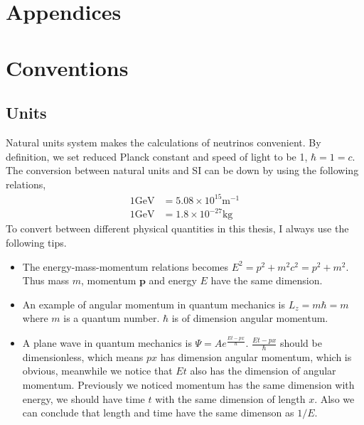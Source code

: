 


\chapter*{Appendices}
\label{chap:appendices}

\appendix


\chapter{\label{chap:app-sec:conventions}Conventions}


\section{Units}


Natural units system makes the calculations of neutrinos convenient. By definition, we set reduced Planck constant and speed of light to be 1, $\hbar = 1 = c$.
The conversion between natural units and SI can be down by using the following relations,
\begin{align}
   1 \mathrm{GeV} &= 5.08 \times 10^{15} \mathrm {m^{-1}} \\
   1 \mathrm{GeV} &= 1.8\times 10^{-27} \mathrm{kg}
\end{align}
To convert between different physical quantities in this thesis, I always use the following tips.
\begin{itemize}
    \item The energy-mass-momentum relations becomes $E^2 = p^2 + m^2c^2 = p^2 + m^2$. Thus mass $m$, momentum $\mathbf p$ and energy $E$ have the same dimension.
    \item An example of angular momentum in quantum mechanics is $L_z = m\hbar = m$ where $m$ is a quantum number. $\hbar$ is of dimension angular momentum.
    \item A plane wave in quantum mechanics is $\Psi = A e^{ \frac{E t - p x}{\hbar} }$. $\frac{E t - p x}{\hbar}$ should be dimensionless, which means $px$ has dimension angular momentum, which is obvious, meanwhile we notice that $E t$ also has the dimension of angular momentum. Previously we noticed momentum has the same dimension with energy, we should have time $t$ with the same dimension of length $x$. Also we can conclude that length and time have the same dimenson as $1/E$.
\end{itemize}


